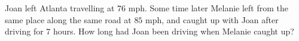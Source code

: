 Joan left Atlanta travelling at $76$ mph. Some time later Melanie left from the same place along the same road at $85$ mph, and caught up with Joan after driving for $7$ hours. How long had Joan been driving when Melanie caught up?
